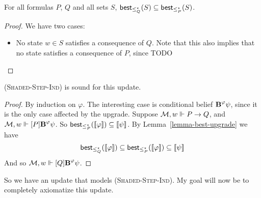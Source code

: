 \documentclass[letterpaper]{article}
\begin{document}
\begin{lemma}\label{lemma-best-upgrade}
    For all formulas $P$, $Q$ and all sets $S$, $\mathsf{best}_{\leq^\star_Q}(S) \subseteq \mathsf{best}_{\leq^\star_P}(S)$.
\end{lemma}
\begin{proof}
    We have two cases:
    \begin{itemize}
        \item No state $w \in S$ satisfies a consequence of $Q$.  Note that this also implies that no state satisfies a consequence of $P$, since TODO
    \end{itemize}
\end{proof}

\begin{theorem}
    \textsc{(Shaded-Step-Ind)} is sound for this update.
\end{theorem}
\begin{proof}
    By induction on $\varphi$.  The interesting case is conditional belief $\textrm{\textup{\textbf{B}}}^{\varphi} \psi$, since it is the only case affected by the upgrade.  Suppose $\mathcal{M}, w \Vdash P \to Q$, and $\mathcal{M}, w \Vdash [P] \textrm{\textup{\textbf{B}}}^{\varphi} \psi$.  So $\mathsf{best}_{\leq^\star_P}([\![\mbox{\em $ \varphi $\/}]\!]) \subseteq [\![\mbox{\em $ \psi $\/}]\!]$.  By Lemma~\ref{lemma-best-upgrade} we have
    \[
        \mathsf{best}_{\leq^\star_Q}([\![\mbox{\em $ \varphi $\/}]\!]) \subseteq \mathsf{best}_{\leq^\star_P}([\![\mbox{\em $ \varphi $\/}]\!]) \subseteq [\![\mbox{\em $ \psi $\/}]\!]
    \]
    And so $\mathcal{M}, w \Vdash [Q] \textrm{\textup{\textbf{B}}}^{\varphi} \psi$.
\end{proof}

So we have an update that models \textsc{(Shaded-Step-Ind)}. My goal will now be to completely axiomatize this update.
\end{document}
